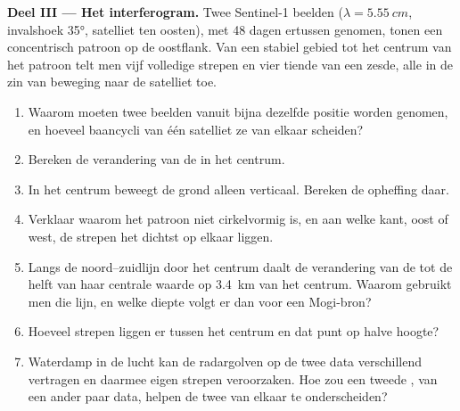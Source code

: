 \begin{problem}
\medskip\noindent\textbf{Deel III --- Het interferogram.} Twee Sentinel-1
beelden ($\lambda = \qty{5.55}{cm}$, invalshoek \ang{35}, satelliet ten
oosten), met 48 dagen ertussen genomen, tonen een concentrisch patroon op de oostflank.
Van een stabiel gebied tot het centrum van het patroon telt men vijf volledige strepen en
vier tiende van een zesde, alle in de zin van beweging naar de
satelliet toe.
\begin{enumerate}[resume]
\item Waarom moeten twee beelden vanuit bijna dezelfde positie worden genomen, en
  hoeveel baancycli van één satelliet ze van elkaar scheiden?
\item Bereken de verandering van de  in het centrum.
\item In het centrum beweegt de grond alleen verticaal. Bereken de opheffing
  daar.
\item Verklaar waarom het patroon niet cirkelvormig is, en aan welke kant, oost of
  west, de strepen het dichtst op elkaar liggen.
\item Langs de noord--zuidlijn door het centrum daalt de verandering van de
   tot de helft van haar centrale waarde op \qty{3.4}{km} van het
  centrum. Waarom gebruikt men die lijn, en welke diepte volgt er dan voor
  een Mogi-bron?
\item Hoeveel strepen liggen er tussen het centrum en dat punt op halve hoogte?
\item Waterdamp in de lucht kan de radargolven op de twee data verschillend vertragen
  en daarmee eigen strepen veroorzaken. Hoe zou een tweede ,
  van een ander paar data, helpen de twee van elkaar te onderscheiden?
\end{enumerate}


\end{problem}
